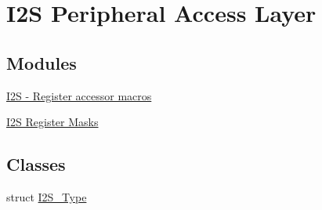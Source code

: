 \hypertarget{group__I2S__Peripheral__Access__Layer}{}\section{I2S Peripheral Access Layer}
\label{group__I2S__Peripheral__Access__Layer}
\subsection*{Modules}
\begin{DoxyCompactItemize}
\item 
\hyperlink{group__I2S__Register__Accessor__Macros}{I2\+S -\/ Register accessor macros}
\item 
\hyperlink{group__I2S__Register__Masks}{I2\+S Register Masks}
\end{DoxyCompactItemize}
\subsection*{Classes}
\begin{DoxyCompactItemize}
\item 
struct \hyperlink{structI2S__Type}{I2\+S\+\_\+\+Type}
\end{DoxyCompactItemize}
